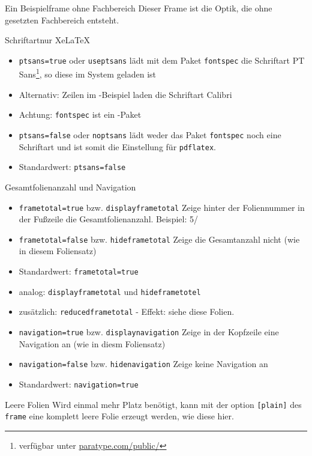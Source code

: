 \documentclass[german,10pt,xcolor=colortbl,compress
]{beamer}
\begin{document}
	\fbsetfalse
	\begin{frame}{Ein Beispielframe ohne Fachbereich}
		Dieser Frame ist die Optik, die ohne gesetzten Fachbereich entsteht.
	\end{frame}
	\fbsettrue
	\begin{frame}{Schriftart}{nur XeLaTeX}
		\begin{itemize}
			\item \lstinline|ptsans=true| oder \lstinline|useptsans| lädt mit dem Paket \lstinline|fontspec| die Schriftart PT Sans\footnote{verfügbar unter \href{http://www.paratype.com/public/}{paratype.com/public/}}, so diese im System geladen ist
			\item Alternativ: Zeilen im \XeLaTeX-Beispiel laden die Schriftart Calibri
			\item Achtung: \lstinline|fontspec| ist ein \XeLaTeX-Paket
			\item \lstinline|ptsans=false| oder \lstinline|noptsans| lädt weder das Paket \lstinline|fontspec| noch eine Schriftart und ist somit die Einstellung für \lstinline!pdflatex!.
			\item Standardwert: \lstinline|ptsans=false|
		\end{itemize}
	\end{frame}
	\begin{frame}{Gesamtfolienanzahl und Navigation}
		\begin{itemize}
			\item \lstinline|frametotal=true| bzw. \lstinline|displayframetotal| Zeige hinter der Foliennummer in der Fußzeile die Gesamtfolienanzahl. Beispiel: 5/\inserttotalframenumber
			\item \lstinline|frametotal=false| bzw. \lstinline|hideframetotal| Zeige die Gesamtanzahl nicht (wie in diesem Foliensatz)
			\item Standardwert: \lstinline|frametotal=true|
			\item analog: \lstinline|displayframetotal| und \lstinline|hideframetotel|
			\item zusätzlich: \lstinline|reducedframetotal| - Effekt: siehe diese Folien.
		\end{itemize}
		\vspace{\baselineskip}
		\begin{itemize}
			\item \lstinline|navigation=true| bzw. \lstinline|displaynavigation| Zeige in der Kopfzeile eine Navigation an (wie in diesm Foliensatz)
			\item \lstinline|navigation=false| bzw. \lstinline|hidenavigation| Zeige keine Navigation an
			\item Standardwert: \lstinline|navigation=true|
		\end{itemize}
	\end{frame}
	\begin{frame}[plain]{Leere Folien}
		Wird einmal mehr Platz benötigt, kann mit der option \lstinline|[plain]| des \lstinline|frame| eine komplett leere Folie erzeugt werden, wie diese hier.
	\end{frame}
\end{document}
